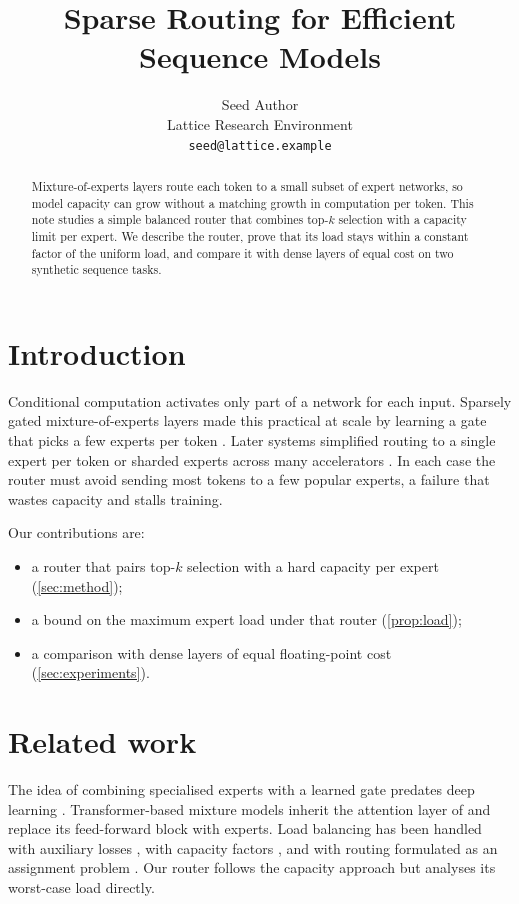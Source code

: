 \documentclass{article}
\title{Sparse Routing for Efficient Sequence Models}
\author{Seed Author \\
Lattice Research Environment \\
\texttt{seed@lattice.example}}
\begin{document}
\maketitle

\begin{abstract}
Mixture-of-experts layers route each token to a small subset of expert networks, so model capacity can grow without a matching growth in computation per token.
This note studies a simple balanced router that combines top-$k$ selection with a capacity limit per expert.
We describe the router, prove that its load stays within a constant factor of the uniform load, and compare it with dense layers of equal cost on two synthetic sequence tasks.
\end{abstract}

\section{Introduction}
\label{sec:intro}

Conditional computation activates only part of a network for each input.
Sparsely gated mixture-of-experts layers made this practical at scale by learning a gate that picks a few experts per token \citep{shazeer2017outrageously}.
Later systems simplified routing to a single expert per token \citep{fedus2022switch} or sharded experts across many accelerators \citep{lepikhin2021gshard}.
In each case the router must avoid sending most tokens to a few popular experts, a failure that wastes capacity and stalls training.

Our contributions are:
\begin{itemize}
  \item a router that pairs top-$k$ selection with a hard capacity per expert (\cref{sec:method});
  \item a bound on the maximum expert load under that router (\cref{prop:load});
  \item a comparison with dense layers of equal floating-point cost (\cref{sec:experiments}).
\end{itemize}




\section{Related work}
\label{sec:related}

The idea of combining specialised experts with a learned gate predates deep learning \citep{jacobs1991adaptive}.
Transformer-based mixture models inherit the attention layer of \citet{vaswani2017attention} and replace its feed-forward block with experts.
Load balancing has been handled with auxiliary losses \citep{shazeer2017outrageously,fedus2022switch}, with capacity factors \citep{lepikhin2021gshard}, and with routing formulated as an assignment problem \citep{lewis2021base}.
Our router follows the capacity approach but analyses its worst-case load directly.
\end{document}
